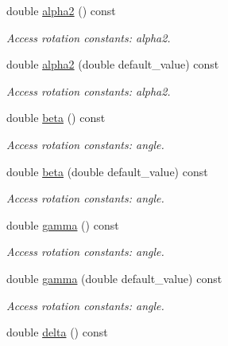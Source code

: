 \begin{DoxyCompactItemize}
double \hyperlink{struct_d_d4hep_1_1_x_m_l_1_1_dimension_ade02ecc4a40727303bf499637c1388cc}{alpha2} () const 
\begin{DoxyCompactList}\small\item\em Access rotation constants: alpha2. \item\end{DoxyCompactList}\item 
double \hyperlink{struct_d_d4hep_1_1_x_m_l_1_1_dimension_a95e847f22f55049134d157eb4644fb49}{alpha2} (double default\_\-value) const 
\begin{DoxyCompactList}\small\item\em Access rotation constants: alpha2. \item\end{DoxyCompactList}\item 
double \hyperlink{struct_d_d4hep_1_1_x_m_l_1_1_dimension_a59e26f703efecee96097d60dc0632824}{beta} () const 
\begin{DoxyCompactList}\small\item\em Access rotation constants: angle. \item\end{DoxyCompactList}\item 
double \hyperlink{struct_d_d4hep_1_1_x_m_l_1_1_dimension_a474e98f605818ece737dc8dfbf145c6a}{beta} (double default\_\-value) const 
\begin{DoxyCompactList}\small\item\em Access rotation constants: angle. \item\end{DoxyCompactList}\item 
double \hyperlink{struct_d_d4hep_1_1_x_m_l_1_1_dimension_a585292a92a43f65c8dcd89f5f96706bd}{gamma} () const 
\begin{DoxyCompactList}\small\item\em Access rotation constants: angle. \item\end{DoxyCompactList}\item 
double \hyperlink{struct_d_d4hep_1_1_x_m_l_1_1_dimension_af5bbe468bc9055c3903293337df7aaba}{gamma} (double default\_\-value) const 
\begin{DoxyCompactList}\small\item\em Access rotation constants: angle. \item\end{DoxyCompactList}\item 
double \hyperlink{struct_d_d4hep_1_1_x_m_l_1_1_dimension_a551b162ee5fcf0f8d01382714a93d82b}{delta} () const 

\end{DoxyCompactItemize}
